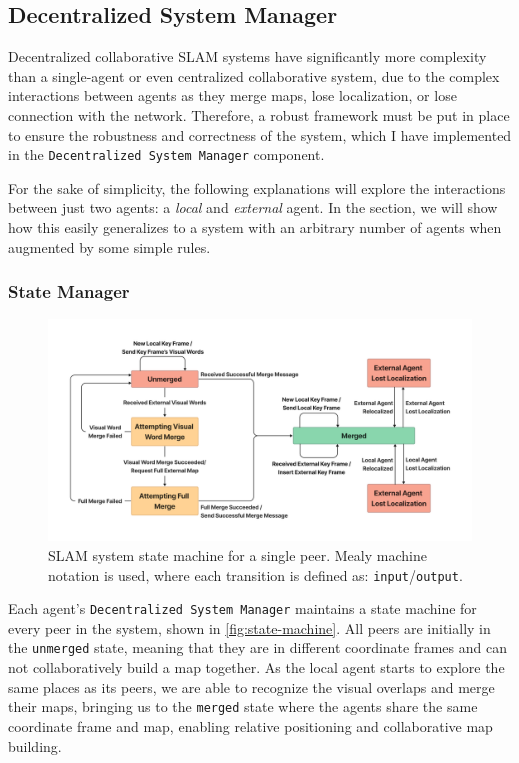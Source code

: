 \subsection{Decentralized System Manager}
\label{sec:decentralized-system-manager}
Decentralized collaborative SLAM systems have significantly more complexity than a single-agent or even centralized collaborative system, due to the complex interactions between agents as they merge maps, lose localization, or lose connection with the network. Therefore, a robust framework must be put in place to ensure the robustness and correctness of the system, which I have implemented in the \texttt{Decentralized System Manager} component.

For the sake of simplicity, the following explanations will explore the interactions between just two agents: a \textit{local} and \textit{external} agent. In the \textit{} section, we will show how this easily generalizes to a system with an arbitrary number of agents when augmented by some simple rules.

\subsubsection{State Manager}
\label{sec:state-manager}

\begin{figure}[h]
    \centering
    \includegraphics[trim=5cm 5cm 5cm 5cm, scale=0.2]{figures/slam_system_state_machine.pdf}
    \caption{SLAM system state machine for a single peer. Mealy machine notation is used, where each transition is defined as: \texttt{input}/\texttt{output}.}
    \label{fig:state-machine}
\end{figure}

Each agent's \texttt{Decentralized System Manager} maintains a state machine for every peer in the system, shown in \autoref{fig:state-machine}. All peers are initially in the \texttt{unmerged} state, meaning that they are in different coordinate frames and can not collaboratively build a map together. As the local agent starts to explore the same places as its peers, we are able to recognize the visual overlaps and merge their maps, bringing us to the \texttt{merged} state where the agents share the same coordinate frame and map, enabling relative positioning and collaborative map building.

